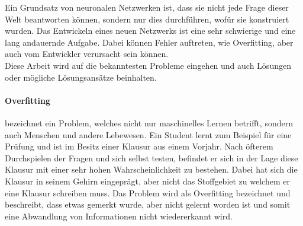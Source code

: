 Ein Grundsatz von neuronalen Netzwerken ist, dass sie nicht jede Frage dieser Welt beantworten können, sondern nur dies durchführen, wofür sie konstruiert wurden. 
Das Entwickeln eines neuen Netzwerks ist eine sehr schwierige und eine lang andauernde Aufgabe. 
Dabei können Fehler auftreten, wie Overfitting, aber auch vom Entwickler verursacht sein können. \\


\noindent
Diese Arbeit wird auf die bekanntesten Probleme eingehen und auch Lösungen oder mögliche Lösungsansätze beinhalten. 


\paragraph{Overfitting} bezeichnet ein Problem, welches nicht nur maschinelles Lernen betrifft, sondern auch Menschen und andere Lebewesen. 
Ein Student lernt zum Beispiel für eine Prüfung und ist im Besitz einer Klausur aus einem Vorjahr. 
Nach öfterem Durchspielen der Fragen und sich selbst testen, befindet er sich in der Lage diese Klausur mit einer sehr hohen Wahrscheinlichkeit zu bestehen. 
Dabei hat sich die Klausur in seinem Gehirn eingeprägt, aber nicht das Stoffgebiet zu welchem er eine Klausur schreiben muss. 
Das Problem wird als Overfitting bezeichnet und beschreibt, dass etwas gemerkt wurde, aber nicht gelernt worden ist und somit eine Abwandlung von Informationen nicht wiedererkannt wird.


